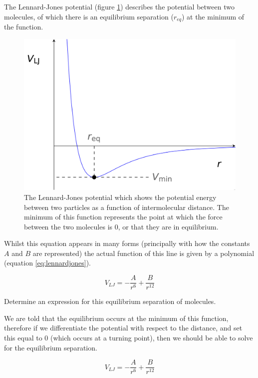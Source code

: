 \documentclass[
]{book}
\begin{document}
The Lennard-Jones potential (figure \ref{fig:lennardjones}) describes the potential between two molecules, of which there is an equilibrium separation (\(r_{eq}\)) at the minimum of the function.

\begin{figure}

{\centering \includegraphics[width=0.7\linewidth]{images/lennardjones} 

}

\caption{The Lennard-Jones potential which shows the potential energy between two particles as a function of intermolecular distance. The minimum of this function represents the point at which the force between the two molecules is 0, or that they are in equilibrium.}\label{fig:lennardjones}
\end{figure}

Whilst this equation appears in many forms (principally with how the constants \(A\) and \(B\) are represented) the actual function of this line is given by a polynomial (equation \eqref{eq:lennardjones}).

\begin{equation}
V_{LJ}=-\frac{A}{r^6}+\frac{B}{r^{12}}
\label{eq:lennardjones}
\end{equation}

Determine an expression for this equilibrium separation of molecules.

We are told that the equilibrium occurs at the minimum of this function, therefore if we differentiate the potential with respect to the distance, and set this equal to 0 (which occurs at a turning point), then we should be able to solve for the equilibrium separation.

\begin{equation*}
V_{LJ}=-\frac{A}{r^6}+\frac{B}{r^{12}}
\end{equation*}
\end{document}
